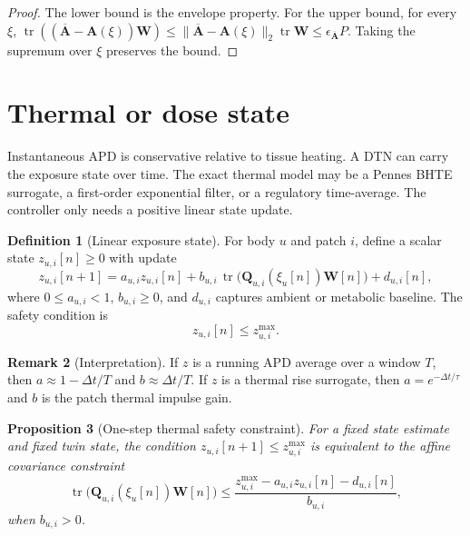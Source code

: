 \documentclass[11pt,a4paper]{article}
\theoremstyle{definition}
\newtheorem{definition}{Definition}[section]
\newtheorem{remark}[definition]{Remark}
\theoremstyle{plain}
\newtheorem{proposition}[definition]{Proposition}
\newcommand{\W}{\mathbf W}
\newcommand{\Q}{\mathbf Q}
\newcommand{\A}{\mathbf A}
\newcommand{\Abar}{\overline{\mathbf A}}
\newcommand{\tr}{\operatorname{tr}}
\begin{document}
\begin{proof}
The lower bound is the envelope property.  For the upper bound, for every
$\xi$,
$\tr((\Abar-\A(\xi))\W)\le\|\Abar-\A(\xi)\|_2\tr\W\le\epsilon_{\Abar}P$.
Taking the supremum over $\xi$ preserves the bound.
\end{proof}

\section{Thermal or dose state}

Instantaneous APD is conservative relative to tissue heating.  A DTN can
carry the exposure state over time.  The exact thermal model may be a
Pennes BHTE surrogate, a first-order exponential filter, or a regulatory
time-average.  The controller only needs a positive linear state update.

\begin{definition}[Linear exposure state]
For body $u$ and patch $i$, define a scalar state $z_{u,i}[n]\ge0$ with
update
\begin{equation}\label{eq:thermal-state}
  z_{u,i}[n+1]
  =a_{u,i}z_{u,i}[n]
  +b_{u,i}\,\tr\!\bigl(\Q_{u,i}(\xi_u[n])\W[n]\bigr)
  +d_{u,i}[n],
\end{equation}
where $0\le a_{u,i}<1$, $b_{u,i}\ge0$, and $d_{u,i}$ captures ambient or
metabolic baseline.  The safety condition is
\begin{equation}
  z_{u,i}[n]\le z_{u,i}^{\max}.
\end{equation}
\end{definition}

\begin{remark}[Interpretation]
If $z$ is a running APD average over a window $T$, then
$a\approx1-\Delta t/T$ and $b\approx\Delta t/T$.  If $z$ is a thermal
rise surrogate, then $a=e^{-\Delta t/\tau}$ and $b$ is the patch thermal
impulse gain.
\end{remark}

\begin{proposition}[One-step thermal safety constraint]\label{prop:one-step}
For a fixed state estimate and fixed twin state, the condition
$z_{u,i}[n+1]\le z_{u,i}^{\max}$ is equivalent to the affine covariance
constraint
\begin{equation}\label{eq:thermal-affine}
  \tr\!\bigl(\Q_{u,i}(\xi_u[n])\W[n]\bigr)
  \le
  \frac{z_{u,i}^{\max}-a_{u,i}z_{u,i}[n]-d_{u,i}[n]}{b_{u,i}},
\end{equation}
when $b_{u,i}>0$.
\end{proposition}
\end{document}
